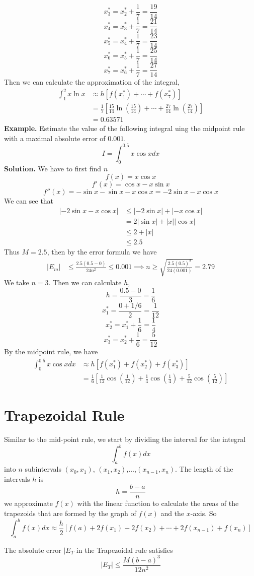 \documentclass[openany]{report}
\begin{document}
\[x_3^* = x_2^* + \frac{1}{7} = \frac{19}{14}\]
\[x_4^* = x_3^* + \frac{1}{7} = \frac{21}{14}\]
\[x_5^* = x_4^* + \frac{1}{7} = \frac{23}{14}\]
\[x_6^* = x_5^* + \frac{1}{7} = \frac{25}{14}\]
\[x_7^* = x_6^* + \frac{1}{7} = \frac{27}{14}\]
Then we can calculate the approximation of the integral,
\begin{align*}
    \int_1^2 x\ln x &\approx h[f(x_1^*) + \cdots + f(x_7^*)]\\
    &= \frac{1}{7}\left[\frac{15}{14} \ln \left(\frac{15}{14}\right) + \cdots + \frac{27}{14}\ln\left(\frac{27}{14}\right)\right]\\
    &= 0.63571
\end{align*}
\textbf{Example.} Estimate the value of the following integral uing the midpoint rule with a maximal absolute error of $0.001$.
\[I = \int_0^{0.5}x\cos x dx\]
\textbf{Solution.} We have to first find $n$ 
\[f(x) = x\cos x\]
\[f'(x) = \cos x - x\sin x\]
\[f''(x) = -\sin x - \sin x - x\cos x = -2\sin x - x\cos x\]
We can see that 
\begin{align*}
    |-2\sin x - x\cos x| &\leq |-2\sin x| + |-x\cos x|\\
    &= 2|\sin x| + |x||\cos x|\\
    &\leq 2 + |x|\\
    &\leq 2.5   
\end{align*}
Thus $M = 2.5$, then by the error formula we have
\begin{align*}
    |E_m| &\leq \frac{2.5(0.5-0)}{24n^2} \leq 0.001  \implies n \geq \sqrt{\frac{2.5(0.5)^3}{24(0.001)}} = 2.79
\end{align*}
We take $n = 3$. Then we can calculate $h$,
\[h = \frac{0.5 -0}{3} = \frac{1}{6}\]
\[x_1^* = \frac{0 + 1/6}{2} = \frac{1}{12}\]
\[x_2^* = x_1^* + \frac{1}{6} = \frac{1}{4}\]
\[x_3^* = x_2^* + \frac{1}{6} = \frac{5}{12}\]
By the midpoint rule, we have 
\begin{align*}
    \int_{0}^{0.5} x\cos x dx &\approx h[f(x_1^*) + f(x_2^*) + f(x_3^*)]\\
    &= \frac{1}{6}\left[\frac{1}{12}\cos \left(\frac{1}{12}\right) + \frac{1}{4}\cos \left(\frac{1}{4}\right) + \frac{5}{12}\cos \left(\frac{5}{12}\right)\right]
\end{align*}

\section{Trapezoidal Rule}
Similar to the mid-point rule, we start by dividing the interval for the integral 
\[\int_a^b f(x)dx\]
into $n$ subintervals $(x_0,x_1)$, $(x_1,x_2)$,$\ldots$,$(x_{n-1}, x_n)$. The length of the intervals $h$ is 
\[h = \frac{b-a}{n}\]
we approximate $f(x)$ with the linear function to calculate the areas of the trapezoids that are formed by the graph of $f(x)$ and the $x$-axis. So 
\[\int_a^b f(x)dx\approx \frac{h}{2}\left[f(a) + 2f(x_1) + 2f(x_2) + \cdots + 2f(x_{n-1}) + f(x_n)\right]\]
\begin{theorem}
    The absolute error $|E_T$ in the Trapezoidal rule satisfies
    \[|E_T| \leq \frac{M(b-a)^3}{12n^2}\]
\end{theorem}
\end{document}
